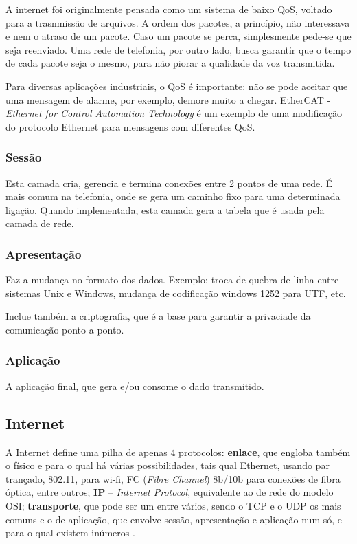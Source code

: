 A internet foi originalmente pensada como um sistema de baixo QoS, voltado para a trasnmissão de arquivos. A ordem dos pacotes, a princípio, não interessava e nem o atraso de um pacote. Caso um pacote se perca, simplesmente pede-se que seja reenviado. Uma rede de telefonia, por outro lado, busca garantir que o tempo de cada pacote seja o mesmo, para não piorar a qualidade da voz transmitida.

 Para diversas aplicações industriais, o QoS é importante: não se pode aceitar que uma mensagem de alarme, por exemplo, demore muito a chegar. EtherCAT - \emph{Ethernet for Control Automation Technology} é um exemplo de uma modificação do protocolo Ethernet para mensagens com diferentes QoS.
 
\subsubsection{Sessão}
Esta camada cria, gerencia e termina conexões entre 2 pontos de uma rede. É mais comum na telefonia, onde se gera um caminho fixo para uma determinada ligação. Quando implementada, esta camada gera a tabela que é usada pela camada de rede.

\subsubsection{Apresentação}
Faz a mudança no formato dos dados. Exemplo: troca de quebra de linha entre sistemas Unix e Windows, mudança de codificação windows 1252 para UTF, etc.

Inclue também a criptografia, que é a base para garantir a privaciade da comunicação ponto-a-ponto.

\subsubsection{Aplicação}
A aplicação final, que gera e/ou consome o dado transmitido.

\subsection{Internet}
	A Internet define uma pilha de apenas 4 protocolos: \textbf{enlace}, que engloba também o físico e para o qual há várias possibilidades, tais qual Ethernet, usando par trançado, 802.11, para wi-fi, FC (\emph{Fibre Channel}) 8b/10b para conexões de fibra óptica, entre outros; \textbf{IP} -- \emph{Internet Protocol}, equivalente ao de rede do modelo OSI; \textbf{transporte}, que pode ser um entre vários, sendo o TCP e o UDP os mais comuns e o de aplicação, que envolve sessão, apresentação e aplicação num só, e para o qual existem inúmeros
	.

